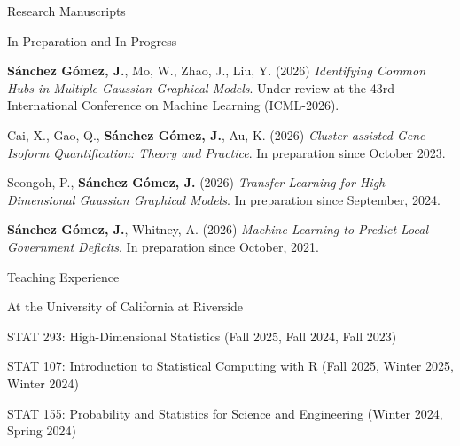 \documentclass{resume_customized} %
\begin{document}
\begin{rSection}{Research Manuscripts}
\begin{rSubsection}{In Preparation and In Progress}{}{}
    	\item {\bf Sánchez Gómez, J.}, Mo, W., Zhao, J., Liu, Y. (2026) {\it Identifying Common Hubs in Multiple Gaussian Graphical Models}. Under review at the 43rd International Conference on Machine Learning (ICML-2026).

		\item Cai, X., Gao, Q., {\bf Sánchez Gómez, J.}, Au, K. (2026)  {\it Cluster-assisted Gene Isoform Quantification: Theory and Practice}. In preparation since October 2023.


    	\item Seongoh, P., {\bf Sánchez Gómez, J.} (2026) {\it Transfer Learning for High-Dimensional Gaussian Graphical Models}. In preparation since September, 2024.
    	
    	\item {\bf Sánchez Gómez, J.}, Whitney, A. (2026) {\it Machine Learning to Predict Local Government Deficits}. In preparation since October, 2021.
    	
    	
	\end{rSubsection}
    
\end{rSection}

\begin{rSection}{Teaching Experience}
		
	\begin{rSubsection}{At the University of California at Riverside}{}{}{}
		
		\item STAT 293: High-Dimensional Statistics (Fall 2025, Fall 2024, Fall 2023)
		\item STAT 107: Introduction to Statistical Computing with R (Fall 2025, Winter 2025, Winter 2024)
		\item STAT 155: Probability and Statistics for Science and
		Engineering (Winter 2024, Spring 2024)
		
	\end{rSubsection}
	
	
\end{rSection}
\end{document}
